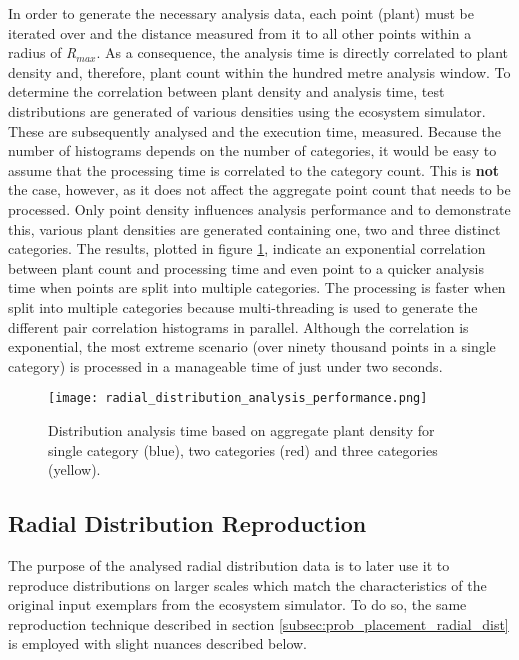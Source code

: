 In order to generate the necessary analysis data, each point (plant) must be iterated over and the distance measured from it to all other points within a radius of \textit{R$_{max}$}. As a consequence, the analysis time is directly correlated to plant density and, therefore, plant count within the hundred metre analysis window. To determine the correlation between plant density and analysis time, test distributions are generated of various densities using the ecosystem simulator. These are subsequently analysed and the execution time, measured. Because the number of histograms depends on the number of categories, it would be easy to assume that the processing time is correlated to the category count. This is \textbf{not} the case, however, as it does not affect the aggregate point count that needs to be processed. Only point density influences analysis performance and to demonstrate this, various plant densities are generated containing one, two and three distinct categories. The results, plotted in figure \ref{fig:analysis_perf}, indicate an exponential correlation between plant count and processing time and even point to a quicker analysis time when points are split into multiple categories. The processing is faster when split into multiple categories because multi-threading is used to generate the different pair correlation histograms in parallel. Although the correlation is exponential, the most extreme scenario (over ninety thousand points in a single category) is processed in a manageable time of just under two seconds. \\

\begin{figure}
\center
	\texttt{[image: radial\_distribution\_analysis\_performance.png]}
	\caption{ Distribution analysis time based on aggregate plant density for single category (blue), two categories (red) and three categories (yellow).}	
	\label{fig:analysis_perf}
\end{figure}

\subsection{Radial Distribution Reproduction}

The purpose of the analysed radial distribution data is to later use it to reproduce distributions on larger scales which match the characteristics of the original input exemplars from the ecosystem simulator. To do so, the same reproduction technique described in section \ref{subsec:prob_placement_radial_dist} is employed with slight nuances described below.

